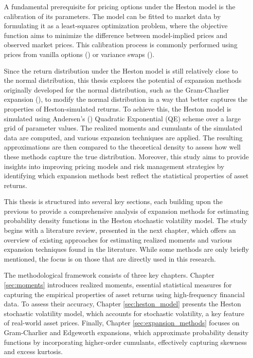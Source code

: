 A fundamental prerequisite for pricing options under the Heston model is the calibration of its parameters. The model can be fitted to market data by formulating it as a least-squares optimization problem, where the objective function aims to minimize the difference between model-implied prices and observed market prices. This calibration process is commonly performed using prices from vanilla options (\cite{flochAdaptiveFilonQuadrature2018}) or variance swaps (\cite{guillaumeHestonModelVariance2013}).

Since the return distribution under the Heston model is still relatively close to the normal distribution, this thesis explores the potential of expansion methods originally developed for the normal distribution, such as the Gram-Charlier expansion (\cite{gramUeberEntwickelungReeller1883,charlierContributionsMathematicalTheory1914}), to modify the normal distribution in a way that better captures the properties of Heston-simulated returns. To achieve this, the Heston model is simulated using Andersen's (\citeyear{andersenEfficientSimulationHeston2007}) Quadratic Exponential (QE) scheme over a large grid of parameter values. The realized moments and cumulants of the simulated data are computed, and various expansion techniques are applied. The resulting approximations are then compared to the theoretical density to assess how well these methods capture the true distribution. Moreover, this study aims to provide insights into improving pricing models and risk management strategies by identifying which expansion methods best reflect the statistical properties of asset returns.

This thesis is structured into several key sections, each building upon the previous to provide a comprehensive analysis of expansion methods for estimating probability density functions in the Heston stochastic volatility model. The study begins with a literature review, presented in the next chapter, which offers an overview of existing approaches for estimating realized moments and various expansion techniques found in the literature. While some methods are only briefly mentioned, the focus is on those that are directly used in this research.

The methodological framework consists of three key chapters. Chapter \ref{sec:moments} introduces realized moments, essential statistical measures for capturing the empirical properties of asset returns using high-frequency financial data. To assess their accuracy, Chapter \ref{sec:heston_model} presents the Heston stochastic volatility model, which accounts for stochastic volatility, a key feature of real-world asset prices. Finally, Chapter \ref{sec:expansion_methods} focuses on Gram-Charlier and Edgeworth expansions, which approximate probability density functions by incorporating higher-order cumulants, effectively capturing skewness and excess kurtosis.

